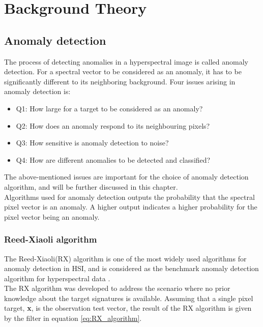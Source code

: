 \newpage
\chapter{Background Theory}
\label{sec:theory}

\section{Anomaly detection}
The process of detecting anomalies in a hyperspectral image is called anomaly detection. For a spectral vector to be considered as an anomaly, it has to be significantly different to its neighboring background. Four issues arising in anomaly detection \cite{chang2006characterization} is:
\\
 
\begin{itemize}
  \item Q1: How large for a target to be considered as an anomaly?
  \item Q2: How does an anomaly respond to its neighbouring pixels?
  \item Q3: How sensitive is anomaly detection to noise?
  \item Q4: How are different anomalies to be detected and classified?
\end{itemize}

The above-mentioned issues are important for the choice of anomaly detection algorithm, and will be further discussed in this chapter.
\\
Algorithms used for anomaly detection outputs the probability that the spectral pixel vector is an anomaly. A higher output indicates a higher probability for the pixel vector being an anomaly.


\subsection{Reed-Xiaoli algorithm}
The Reed-Xiaoli(RX) algorithm \cite{reed1990adaptive} is one of the most widely used algorithms for anomaly detection in HSI, and is considered as the benchmark anomaly detection algorithm for hyperspectral data \cite{yang2015dual}.  
\\
The RX algorithm was developed to address the scenario where no prior knowledge about the target signatures is available. Assuming that a single pixel target, \textbf{x}, is the observation test vector, the result of the RX algorithm is given by the filter in equation \ref{eq:RX_algorithm}.

